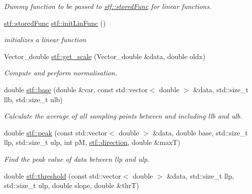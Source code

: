 \begin{DoxyCompactItemize}
\begin{DoxyCompactList}\small\item\em Dummy function to be passed to \hyperlink{structstf_1_1storedFunc}{stf::storedFunc} for linear functions. \item\end{DoxyCompactList}\item 
\hyperlink{structstf_1_1storedFunc}{stf::storedFunc} \hyperlink{group__stfgen_gacce99eda0b9fa51555b8b8adbfef7700}{stf::initLinFunc} ()
\begin{DoxyCompactList}\small\item\em initializes a linear function \item\end{DoxyCompactList}\item 
Vector\_\-double \hyperlink{group__stfgen_ga89d5f83830be9b0132ddb34c5d46d281}{stf::get\_\-scale} (Vector\_\-double \&data, double oldx)
\begin{DoxyCompactList}\small\item\em Compute and perform normalisation. \item\end{DoxyCompactList}\item 
double \hyperlink{group__stfgen_ga365e8fdc4f5836f495e6f1dd95baf3fa}{stf::base} (double \&var, const std::vector$<$ double $>$ \&data, std::size\_\-t llb, std::size\_\-t ulb)
\begin{DoxyCompactList}\small\item\em Calculate the average of all sampling points between and including {\itshape llb\/} and {\itshape ulb\/}. \item\end{DoxyCompactList}\item 
double \hyperlink{group__stfgen_ga0f30710d3729c00c31a1aa82d08badff}{stf::peak} (const std::vector$<$ double $>$ \&data, double base, std::size\_\-t llp, std::size\_\-t ulp, int pM, \hyperlink{group__stfgen_gae8845ae2aeaf4b742a905a2a5571fd5a}{stf::direction}, double \&maxT)
\begin{DoxyCompactList}\small\item\em Find the peak value of {\itshape data\/} between {\itshape llp\/} and {\itshape ulp\/}. \item\end{DoxyCompactList}\item 
double \hyperlink{group__stfgen_gaafcb097f10d8179f38881321d7cd86f3}{stf::threshold} (const std::vector$<$ double $>$ \&data, std::size\_\-t llp, std::size\_\-t ulp, double slope, double \&thrT)

\end{DoxyCompactItemize}
